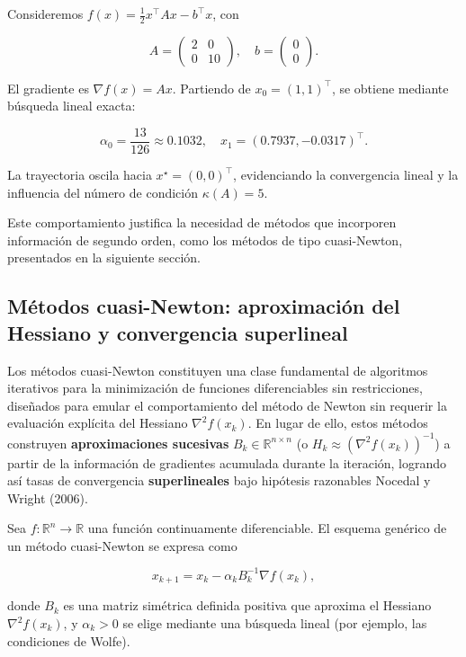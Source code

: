 \documentclass[
  spanish,
  us-letterpaper,
  DIV=11,
  numbers=noendperiod]{scrreprt}
\numberwithin{equation}{section}
\begin{document}
Consideremos \(f(x) = \tfrac{1}{2}x^\top A x - b^\top x\), con

\[
  A = \begin{pmatrix} 2 & 0 \\ 0 & 10 \end{pmatrix}, \quad b = \begin{pmatrix} 0 \\ 0 \end{pmatrix}.
\]

El gradiente es \(\nabla f(x) = A x\). Partiendo de
\(x_0 = (1,1)^\top\), se obtiene mediante búsqueda lineal exacta:

\[
  \alpha_0 = \frac{13}{126} \approx 0.1032, \quad x_1 = (0.7937, -0.0317)^\top.
\]

La trayectoria oscila hacia \(x^\star = (0,0)^\top\), evidenciando la
convergencia lineal y la influencia del número de condición
\(\kappa(A) = 5\).

Este comportamiento justifica la necesidad de métodos que incorporen
información de segundo orden, como los métodos de tipo cuasi-Newton,
presentados en la siguiente sección.

\subsection{Métodos cuasi-Newton: aproximación del Hessiano y
convergencia
superlineal}\label{muxe9todos-cuasi-newton-aproximaciuxf3n-del-hessiano-y-convergencia-superlineal}

Los métodos cuasi-Newton constituyen una clase fundamental de algoritmos
iterativos para la minimización de funciones diferenciables sin
restricciones, diseñados para emular el comportamiento del método de
Newton sin requerir la evaluación explícita del Hessiano
\(\nabla^2 f(x_k)\). En lugar de ello, estos métodos construyen
\textbf{aproximaciones sucesivas} \(B_k \in \mathbb{R}^{n \times n}\) (o
\(H_k \approx (\nabla^2 f(x_k))^{-1}\)) a partir de la información de
gradientes acumulada durante la iteración, logrando así tasas de
convergencia \textbf{superlineales} bajo hipótesis razonables Nocedal y
Wright (2006).

Sea \(f : \mathbb{R}^n \to \mathbb{R}\) una función continuamente
diferenciable. El esquema genérico de un método cuasi-Newton se expresa
como

\[
x_{k+1} = x_k - \alpha_k B_k^{-1} \nabla f(x_k),
\]

donde \(B_k\) es una matriz simétrica definida positiva que aproxima el
Hessiano \(\nabla^2 f(x_k)\), y \(\alpha_k > 0\) se elige mediante una
búsqueda lineal (por ejemplo, las condiciones de Wolfe).
\end{document}
